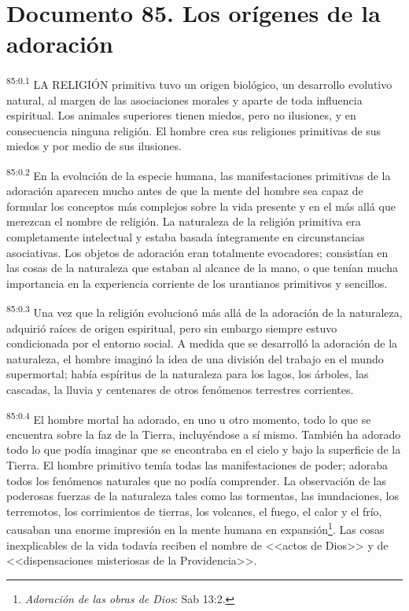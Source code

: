 \chapter{Documento 85. Los orígenes de la adoración}
\par
\textsuperscript{85:0.1} LA RELIGIÓN primitiva tuvo un origen biológico, un desarrollo evolutivo natural, al margen de las asociaciones morales y aparte de toda influencia espiritual. Los animales superiores tienen miedos, pero no ilusiones, y en consecuencia ninguna religión. El hombre crea sus religiones primitivas de sus miedos y por medio de sus ilusiones.

\par
\textsuperscript{85:0.2} En la evolución de la especie humana, las manifestaciones primitivas de la adoración aparecen mucho antes de que la mente del hombre sea capaz de formular los conceptos más complejos sobre la vida presente y en el más allá que merezcan el nombre de religión. La naturaleza de la religión primitiva era completamente intelectual y estaba basada íntegramente en circunstancias asociativas. Los objetos de adoración eran totalmente evocadores; consistían en las cosas de la naturaleza que estaban al alcance de la mano, o que tenían mucha importancia en la experiencia corriente de los urantianos primitivos y sencillos.

\par
\textsuperscript{85:0.3} Una vez que la religión evolucionó más allá de la adoración de la naturaleza, adquirió raíces de origen espiritual, pero sin embargo siempre estuvo condicionada por el entorno social. A medida que se desarrolló la adoración de la naturaleza, el hombre imaginó la idea de una división del trabajo en el mundo supermortal; había espíritus de la naturaleza para los lagos, los árboles, las cascadas, la lluvia y centenares de otros fenómenos terrestres corrientes.

\par
\textsuperscript{85:0.4} El hombre mortal ha adorado, en uno u otro momento, todo lo que se encuentra sobre la faz de la Tierra, incluyéndose a sí mismo. También ha adorado todo lo que podía imaginar que se encontraba en el cielo y bajo la superficie de la Tierra. El hombre primitivo temía todas las manifestaciones de poder; adoraba todos los fenómenos naturales que no podía comprender. La observación de las poderosas fuerzas de la naturaleza tales como las tormentas, las inundaciones, los terremotos, los corrimientos de tierras, los volcanes, el fuego, el calor y el frío, causaban una enorme impresión en la mente humana en expansión\footnote{\textit{Adoración de las obras de Dios}: Sab 13:2.}. Las cosas inexplicables de la vida todavía reciben el nombre de <<actos de Dios>> y de <<dispensaciones misteriosas de la Providencia>>.

